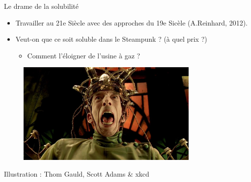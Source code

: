 \documentclass[newPxFont]{beamer}
\begin{document}
\begin{frame}[c]{Le drame de la solubilité}
  \vspace{-2em}
  \begin{itemize}
    \item Travailler au 21e Siècle avec des approches du 19e Sicèle (A.Reinhard, 2012).
    \item Veut-on que ce soit soluble dans le Steampunk ? (à quel prix ?)
    \begin{itemize}
      \item Comment l'éloigner de l'usine à gaz ?
    \end{itemize}
  \end{itemize}

  \begin{figure}
   \includegraphics[height=5cm]{img/La_Cite_des_enfants_perdus.jpg}
  \end{figure}
\end{frame}

%
%

{
%
\begin{frame}
  \begin{minipage}[t][.8\textheight]{\textwidth}

    \vfill

    \hfill {}

    \hfill \small{Illustration : Thom Gauld, Scott Adams \& xkcd}
  \end{minipage}

\end{frame}
}

\end{document}
